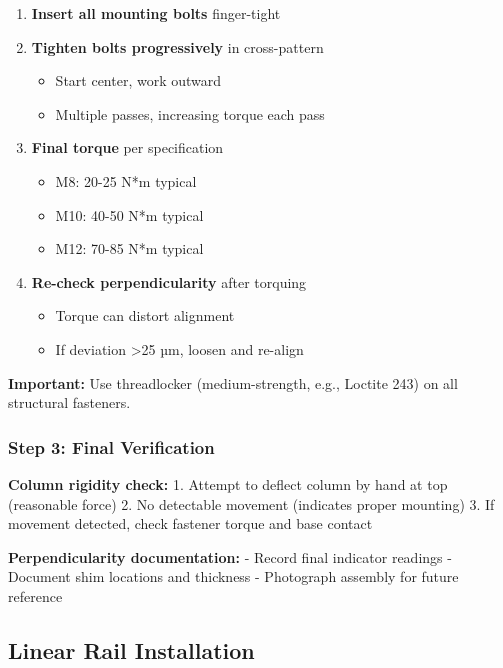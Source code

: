 \documentclass[
]{article}
\providecommand{\tightlist}{%
  \setlength{\itemsep}{0pt}\setlength{\parskip}{0pt}}
\begin{document}
\begin{enumerate}
\def\labelenumi{\arabic{enumi}.}
\tightlist
\item
  \textbf{Insert all mounting bolts} finger-tight
\item
  \textbf{Tighten bolts progressively} in cross-pattern

  \begin{itemize}
  \tightlist
  \item
    Start center, work outward
  \item
    Multiple passes, increasing torque each pass
  \end{itemize}
\item
  \textbf{Final torque} per specification

  \begin{itemize}
  \tightlist
  \item
    M8: 20-25 N*m typical
  \item
    M10: 40-50 N*m typical
  \item
    M12: 70-85 N*m typical
  \end{itemize}
\item
  \textbf{Re-check perpendicularity} after torquing

  \begin{itemize}
  \tightlist
  \item
    Torque can distort alignment
  \item
    If deviation \textgreater25 µm, loosen and re-align
  \end{itemize}
\end{enumerate}

\textbf{Important:} Use threadlocker (medium-strength, e.g., Loctite
243) on all structural fasteners.

\subsubsection{Step 3: Final
Verification}\label{step-3-final-verification}

\textbf{Column rigidity check:} 1. Attempt to deflect column by hand at
top (reasonable force) 2. No detectable movement (indicates proper
mounting) 3. If movement detected, check fastener torque and base
contact

\textbf{Perpendicularity documentation:} - Record final indicator
readings - Document shim locations and thickness - Photograph assembly
for future reference

\subsection{Linear Rail Installation}\label{linear-rail-installation}
\end{document}

